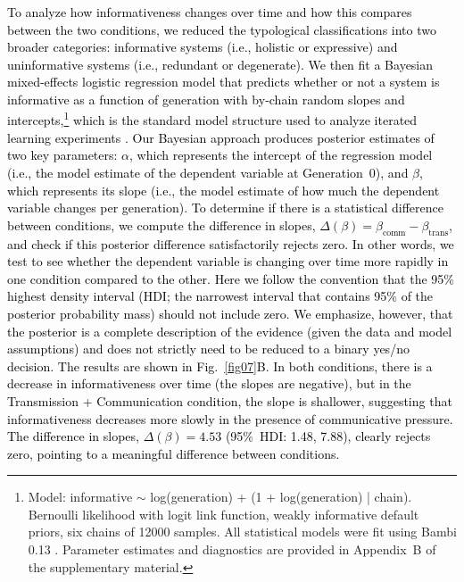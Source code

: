 \documentclass[doc,biblatex]{apa7}
\newcommand\newmaterial[1]{\textcolor{black}{#1}}
\newcommand\secondrevision[1]{\textcolor{black}{#1}}
\begin{document}
\newmaterial{To analyze how informativeness changes over time and how this compares between the two conditions, we reduced the typological classifications into two broader categories: informative systems (i.e., holistic or expressive) and uninformative systems (i.e., redundant or degenerate). We then fit a Bayesian mixed-effects logistic regression model that predicts whether or not a system is informative as a function of generation with by-chain random slopes and intercepts,\footnote{Model: informative $\sim$ log(generation) + (1 + log(generation) | chain). Bernoulli likelihood with logit link function, weakly informative default priors, six chains of 12000 samples. All statistical models were fit using Bambi 0.13 \parencite{Capretto:2022}. Parameter estimates and diagnostics are provided in Appendix~B of the supplementary material.} which is the standard model structure used to analyze iterated learning experiments \parencite{Winter:2016}. Our Bayesian approach produces posterior estimates of two key parameters: $\alpha$, which represents the intercept of the regression model \secondrevision{(i.e., the model estimate of the dependent variable at Generation~0)}, and $\beta$, which represents its slope \secondrevision{(i.e., the model estimate of how much the dependent variable changes per generation)}. To determine if there is a statistical difference between conditions, we compute the difference in slopes, $\Delta(\beta) = \beta_\mathrm{comm} - \beta_\mathrm{trans}$, and check if this posterior difference satisfactorily rejects zero. \secondrevision{In other words, we test to see whether the dependent variable is changing over time more rapidly in one condition compared to the other.} Here we follow the convention that the 95\% highest density interval (HDI; the narrowest interval that contains 95\% of the posterior probability mass) should not include zero. We emphasize, however, that the posterior is a complete description of the evidence (given the data and model assumptions) and does not strictly need to be reduced to a binary yes/no decision. The results are shown in Fig.~\ref{fig07}B. In both conditions, there is a decrease in informativeness over time (the slopes are negative), but in the Transmission + Communication condition, the slope is shallower, suggesting that informativeness decreases more slowly in the presence of communicative pressure. The difference in slopes, $\Delta(\beta) = 4.53$ (95\%~HDI: 1.48, 7.88), clearly rejects zero, pointing to a meaningful difference between conditions.}
\end{document}

